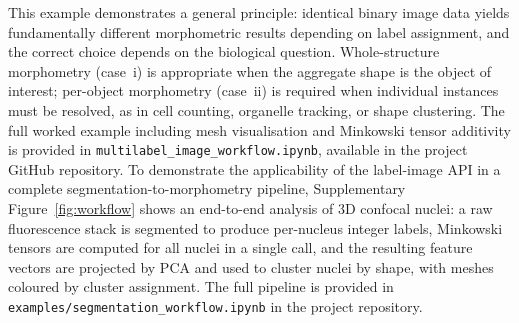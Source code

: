 \documentclass[times, twoside, watermark]{zHenriquesLab-StyleBioRxiv}
\newcommand{\newtxt}[1]{\textcolor{chgadded}{#1}}
\renewcommand{\added}[2][]{\newtxt{#2}}
\begin{document}
This example demonstrates a general principle: identical binary image data yields fundamentally different morphometric results depending on label assignment, and the correct choice depends on the biological question.
Whole-structure morphometry (case~i) is appropriate when the aggregate shape is the object of interest; per-object morphometry (case~ii) is required when individual instances must be resolved, as in cell counting, organelle tracking, or shape clustering.
The full worked example including mesh visualisation and Minkowski tensor additivity is provided in \texttt{multilabel\_image\_workflow.ipynb}, available in the project GitHub repository.
\added{To demonstrate the applicability of the label-image API in a complete segmentation-to-morphometry pipeline, Supplementary Figure~\ref{fig:workflow} shows an end-to-end analysis of 3D confocal nuclei: a raw fluorescence stack is segmented to produce per-nucleus integer labels, Minkowski tensors are computed for all nuclei in a single call, and the resulting feature vectors are projected by PCA and used to cluster nuclei by shape, with meshes coloured by cluster assignment.
The full pipeline is provided in \texttt{examples/segmentation\_workflow.ipynb} in the project repository.}


\end{document}
